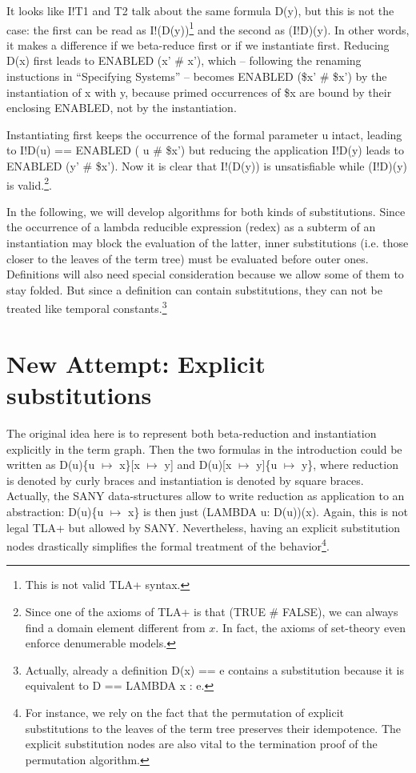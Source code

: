 \documentclass[a4paper]{article}
\newcommand{\tlaplus}[0]{{TLA+}}
\newcommand{\tla}[1]{#1}
\begin{document}
\vspace{2mm}
\noindent
It looks like \tla{I!T1} and \tla{T2} talk about the same formula \tla{D(y)},
but this is not the case: the first can be read as \tla{I!(D(y))}\footnote{This
  is not valid \tlaplus{} syntax.} and the second as \tla{(I!D)(y)}. In other
words, it makes a difference if we beta-reduce first or if we instantiate
first. Reducing D(x) first leads to \tla{ENABLED (x' \# x')}, which --
following the renaming instuctions in ``Specifying Systems'' -- becomes
\tla{ENABLED (\$x' \# \$x')} by the instantiation of \tla{x} with \tla{y},
because primed occurrences of \tla{\$x} are bound by their enclosing ENABLED,
not by the instantiation.

Instantiating first keeps the occurrence of the  formal parameter \tla{u} intact,
leading to \tla{I!D(u) == ENABLED ( u \# \$x') } but reducing the application
\tla{I!D(y)} leads to \tla{ENABLED (y' \# \$x')}. Now it is clear that
\tla{I!(D(y))} is unsatisfiable while \tla{(I!D)(y)} is valid.\footnote{ Since
  one of the axioms  of \tlaplus{} is that (TRUE \# FALSE), we can always find
  a domain element different from $x$. In fact, the axioms of set-theory even
  enforce denumerable models.}.

In the following, we will develop algorithms for both kinds of substitutions.
Since the occurrence of a lambda reducible expression (redex) as a subterm of
an instantiation may block the evaluation of the latter, inner substitutions
(i.e. those closer to the leaves of the term tree) must be evaluated before
outer ones. Definitions will also need special consideration because
we allow some of them to stay folded. But since a definition can contain
substitutions, they can not be treated like temporal constants.\footnote{
  Actually, already a definition \tla{D(x) == e} contains a substitution
  because it is equivalent to D == LAMBDA x : e.
}

\section{New Attempt: Explicit substitutions}

The original idea here is to represent both beta-reduction and instantiation
explicitly in the term graph. Then the two formulas in the introduction
could be written as D(u)\{u $\mapsto$ x\}[x $\mapsto$ y] and
D(u)[x $\mapsto$ y]\{u $\mapsto$ y\}, where reduction is denoted by curly
braces and instantiation is denoted by square braces. Actually, the SANY
data-structures allow to write reduction as application to an abstraction:
D(u)\{u $\mapsto$ x\} is then just \tla{(LAMBDA u: D(u))(x)}. Again, this
is not legal \tlaplus{} but allowed by SANY. Nevertheless, having an explicit
substitution nodes drastically simplifies the formal treatment of the
behavior\footnote{For instance, we rely on the fact that the permutation
  of explicit substitutions to the leaves of the term tree preserves their
  idempotence. The explicit substitution nodes are also vital to the
  termination proof of the permutation algorithm.
}.
\end{document}
